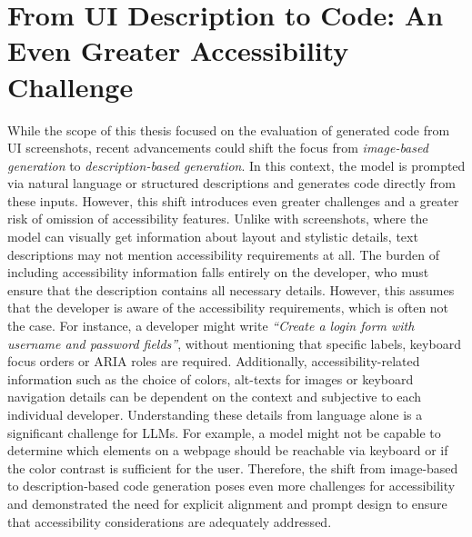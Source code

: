 \section{From UI Description to Code: An Even Greater Accessibility Challenge}
While the scope of this thesis focused on the evaluation of 
generated code from UI screenshots, recent advancements could 
shift the focus from \emph{image-based generation} to 
\emph{description-based generation}. In this context, 
the model is prompted via natural language or structured 
descriptions and generates code directly from these inputs.
However, this shift introduces even greater challenges 
and a greater risk of omission of accessibility features.\newline
Unlike with screenshots, where the model can visually get 
information about layout and stylistic details, text 
descriptions may not mention accessibility requirements at all.
The burden of including accessibility information falls entirely 
on the developer, who must ensure that the description 
contains all necessary details. However, this assumes that 
the developer is aware of the accessibility requirements, 
which is often not the case. For instance, a developer
might write \textit{``Create a login form with username 
and password fields''}, without mentioning that specific 
labels, keyboard focus orders or ARIA roles are required.
Additionally, accessibility-related information such as
the choice of colors, alt-texts for images or keyboard 
navigation details can be dependent on the context and 
subjective to each individual developer. Understanding these 
details from language alone is a significant challenge for
LLMs. For example, a model might not be capable to determine 
which elements on a webpage should be reachable via keyboard
or if the color contrast is sufficient for the user. \newline
Therefore, the shift from image-based to description-based
code generation poses even more challenges for accessibility and 
demonstrated the need for explicit alignment and prompt design 
to ensure that accessibility considerations are adequately addressed.
